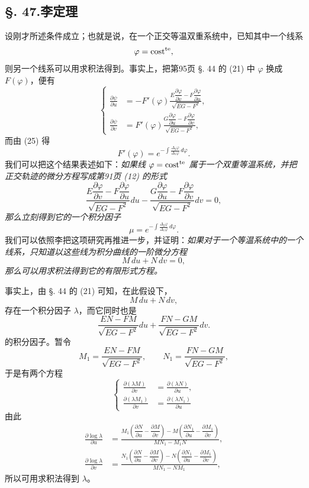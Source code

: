 \subsection*{\S. 47.\quad 李定理}

设刚才所述条件成立；也就是说，在一个正交等温双重系统中，已知其中一个线系
\[
 \varphi=\mathrm{cost}^{\mathrm{te}},
\]
则另一个线系可以用求积法得到。事实上，把第95页 \S. 44 的 (21) 中 \(\varphi\) 换成 \(F(\varphi)\)，便有
\[
\left\{
\begin{aligned}
\frac{\partial\psi}{\partial u}&=-F'(\varphi)\frac{E\dfrac{\partial\varphi}{\partial v}-F\dfrac{\partial\varphi}{\partial u}}{\sqrt{EG-F^2}},\\[0.7em]
\frac{\partial\psi}{\partial v}&=F'(\varphi)\frac{G\dfrac{\partial\varphi}{\partial u}-F\dfrac{\partial\varphi}{\partial v}}{\sqrt{EG-F^2}},
\end{aligned}
\right.
\]
而由 (25) 得
\[
 F'(\varphi)=e^{-\int \frac{\Delta_2\varphi}{\Delta_1\varphi}\,d\varphi}.
\]
我们可以把这个结果表述如下：\emph{如果线 \(\varphi=\mathrm{cost}^{\mathrm{te}}\) 属于一个双重等温系统，并把正交轨迹的微分方程写成第91页 (12) 的形式}
\[
\frac{E\dfrac{\partial\varphi}{\partial v}-F\dfrac{\partial\varphi}{\partial u}}{\sqrt{EG-F^2}}du-
\frac{G\dfrac{\partial\varphi}{\partial u}-F\dfrac{\partial\varphi}{\partial v}}{\sqrt{EG-F^2}}dv=0,
\]
\emph{那么立刻得到它的一个积分因子}
\[
 \mu=e^{-\int \frac{\Delta_2\varphi}{\Delta_1\varphi}\,d\varphi}.
\]
我们可以依照李把这项研究再推进一步，并证明：\emph{如果对于一个等温系统中的一个线系，只知道以这些线为积分曲线的一阶微分方程}
\[
 M\,du+N\,dv=0,
\]
\emph{那么可以用求积法得到它的有限形式方程。}

事实上，由 \S. 44 的 (21) 可知，在此假设下，
\[
 M\,du+N\,dv,
\]
存在一个积分因子 \(\lambda\)，而它同时也是
\[
 \frac{EN-FM}{\sqrt{EG-F^2}}du+\frac{FN-GM}{\sqrt{EG-F^2}}dv.
\]
的积分因子。暂令
\[
 M_1=\frac{EN-FM}{\sqrt{EG-F^2}},
 \qquad
 N_1=\frac{FN-GM}{\sqrt{EG-F^2}},
\]
于是有两个方程
\[
\left\{
\begin{aligned}
\frac{\partial(\lambda M)}{\partial v}&=\frac{\partial(\lambda N)}{\partial u},\\[0.4em]
\frac{\partial(\lambda M_1)}{\partial v}&=\frac{\partial(\lambda N_1)}{\partial u}
\end{aligned}
\right.
\]
由此
\begin{equation}\tag{26}
\begin{aligned}
\frac{\partial\log\lambda}{\partial u}&=
\frac{M_1\left(\dfrac{\partial N}{\partial u}-\dfrac{\partial M}{\partial v}\right)-M\left(\dfrac{\partial N_1}{\partial u}-\dfrac{\partial M_1}{\partial v}\right)}{MN_1-M_1N},\\[0.8em]
\frac{\partial\log\lambda}{\partial v}&=
\frac{N_1\left(\dfrac{\partial N}{\partial u}-\dfrac{\partial M}{\partial v}\right)-N\left(\dfrac{\partial N_1}{\partial u}-\dfrac{\partial M_1}{\partial v}\right)}{MN_1-NM_1},
\end{aligned}
\end{equation}
所以可用求积法得到 \(\lambda\)。

